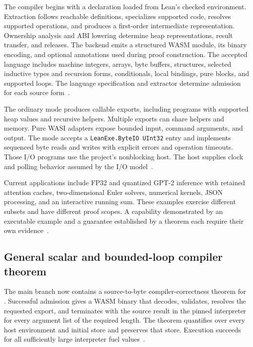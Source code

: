 \documentclass[11pt]{article}
\begin{document}
The compiler begins with a declaration loaded from Lean's checked environment.  Extraction follows reachable definitions, specializes supported code, resolves supported operations, and produces a first-order intermediate representation.  Ownership analysis and ABI lowering determine heap representations, result transfer, and releases.  The backend emits a structured WASM module, its binary encoding, and optional annotations used during proof construction.  The accepted language includes machine integers, arrays, byte buffers, structures, selected inductive types and recursion forms, conditionals, local bindings, pure  blocks, and supported loops.  The language specification and extractor determine admission for each source form~\cite{leanexe-main}.

The ordinary  mode produces callable exports, including programs with supported heap values and recursive helpers.  Multiple exports can share helpers and memory.  Pure WASI adapters expose bounded input, command arguments, and output.  The  mode accepts a \texttt{LeanExe.ByteIO UInt32} entry and implements sequenced byte reads and writes with explicit errors and operation timeouts.  Those I/O programs use the project's nonblocking host.  The host supplies clock and polling behavior assumed by the I/O model~\cite{leanexe-main}.

Current applications include FP32 and quantized GPT-2 inference with retained attention caches, two-dimensional Euler solvers, numerical kernels, JSON processing, and an interactive running sum.  These examples exercise different subsets and have different proof scopes.  A capability demonstrated by an executable example and a guarantee established by a theorem each require their own evidence~\cite{leanexe-main}.

\subsection{General scalar and bounded-loop compiler theorem}

The main branch now contains a source-to-byte compiler-correctness theorem for .  Successful admission gives a WASM binary that decodes, validates, resolves the requested export, and terminates with the source result in the pinned interpreter for every argument list of the required length.  The theorem quantifies over every host environment and initial store and preserves that store.  Execution succeeds for all sufficiently large interpreter fuel values~\cite{compiler-source}.
\end{document}
